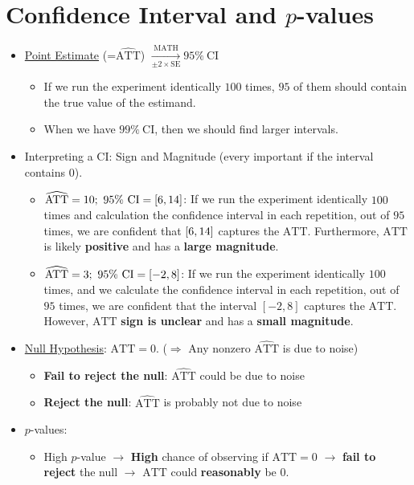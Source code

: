 \documentclass[10pt, letterpaper]{article}
\def\ATT{\mathrm{ATT}}
\def\SE{\mathrm{SE}}
\def\CI{\mathrm{CI}}
\begin{document}
\section{Confidence Interval and $p$-values}
\begin{itemize}
	\item \underline{Point Estimate} (=$\widehat{\ATT}$) $\xrightarrow[\pm 2\times\SE]{\text{MATH}}95\%\ \CI$
	\begin{itemize}
		\item If we run the experiment identically $100$ times, $95$ of them should contain the true value of the estimand. 
		\item When we have $99\%\ \CI$, then we should find larger intervals. 
	\end{itemize}
	\item Interpreting a $\CI$: Sign and Magnitude (every important if the interval contains $0$).
	\begin{itemize}
		\item $\widehat{\ATT}=10;\ 95\%\ \CI=\qty[6,14]$: If we run the experiment identically $100$ times and calculation the confidence interval in each repetition, out of $95$ times, we are confident that $\qty[6,14]$ captures the $\ATT$. Furthermore, $\ATT$ is likely \textbf{positive} and has a \textbf{large magnitude}. 
		\item $\widehat{\ATT}=3;\ 95\%\ \CI=\qty[-2, 8]$: If we run the experiment identically $100$ times, and we calculate the confidence interval in each repetition, out of $95$ times, we are confident that the interval $[-2, 8]$ captures the $\ATT$. However, $\ATT$ \textbf{sign is unclear} and has a \textbf{small magnitude}.
	\end{itemize}
	\item \underline{Null Hypothesis}: $\ATT=0$. ($\Rightarrow$ Any nonzero $\widehat{\ATT}$ is due to noise)
	\begin{itemize}
		\item \textbf{Fail to reject the null}: $\widehat{\ATT}$ could be due to noise
		\item \textbf{Reject the null}: $\widehat{\ATT}$ is probably not due to noise
	\end{itemize}
	\item $p$-values: 
	\begin{itemize}
		\item High $p$-value $\rightarrow$ \textbf{High} chance of observing if $\ATT=0$ $\rightarrow$ \textbf{fail to reject} the null $\rightarrow$ $\ATT$ could \textbf{reasonably} be $0$.

\end{itemize}
\end{itemize}
\end{document}
